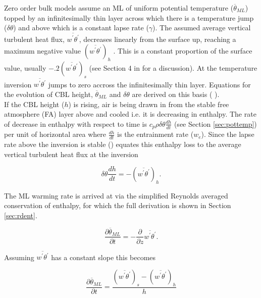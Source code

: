 Zero order bulk models assume an \acs{ML} of uniform potential temperature ($\overline{\theta}_{ML}$) topped by an infinitesimally thin layer across which there is a temperature jump ($\delta \theta$) and above which is a constant lapse rate ($\gamma$).  The assumed average vertical turbulent heat flux, $\overline{w^{'}\theta^{'}}$, decreases linearly from the surface up, reaching a maximum negative value $(\overline{w^{'}\theta^{'}})_{h}$ .  This is a constant proportion of the surface value, usually $-.2(\overline{w^{'}\theta^{'}})_{s}$ (see Section 4 in \citeauthor{Tennekes73} \citeyear{Tennekes73} for a discussion). At the temperature inversion $\overline{w^{'}\theta^{'}}$ jumps to zero accross the infinitesimally thin layer.  Equations for the evolution of \acs{CBL} height, $\overline{\theta}_{ML}$ and $\delta \theta$ are derived on this basis (\citeauthor{Tennekes73} \citeyear{Tennekes73}).\\

If the \acs{CBL} height ($h$) is rising, air is being drawn in from the stable free atmosphere (FA) layer above and cooled i.e. it is decreasing in enthalpy.  The rate of decrease in enthalpy with respect to time is $c_{p}\rho \delta \theta \frac{dh}{dt}$ (see Section \ref{sec:pottemp}) per unit of horizontal area where $\frac{dh}{dt}$ is the entrainment rate ($w_{e}$).  Since the lapse rate above the inversion is stable \citeauthor{Tennekes73} (\citeyear{Tennekes73}) equates this enthalpy loss to the average vertical turbulent heat flux at the inversion

\begin{equation}
\delta \theta \frac{dh}{dt} = -(\overline{w^{'}\theta^{'}})_{h}. 
\end{equation}  

The \acs{ML} warming rate is arrived at via the simplified Reynolds averaged conservation of enthalpy, for which the full derivation is shown in Section \ref{sec:rdent}.

\begin{equation}
\frac{\partial \overline{\theta}_{ML}}{\partial t} = -\frac{\partial}{\partial z}\overline{w^{'}\theta^{'}}.
\end{equation}

Assuming $\overline{w^{'}\theta^{'}}$ has a constant slope this becomes

\begin{equation}
\frac{\partial \overline{\theta}_{ML}}{\partial t} = \frac{(\overline{w^{'}\theta^{'}})_{s}-(\overline{w^{'}\theta^{'}})_{h}}{h}
\end{equation}


